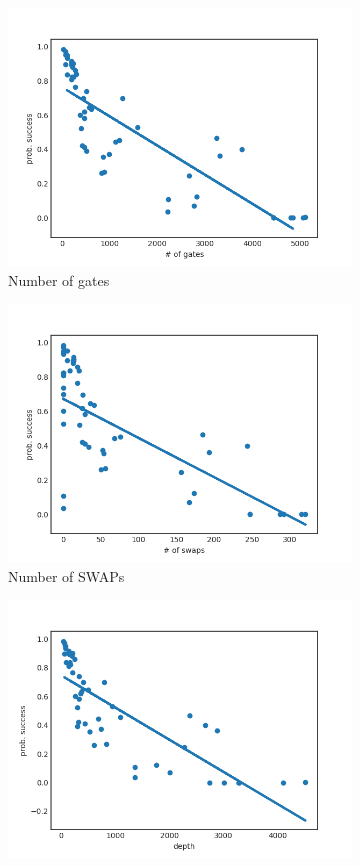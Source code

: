 \documentclass[11pt]{article}
\begin{document}
\begin{figure}[H] 
  \begin{subfigure}[b]{0.5\linewidth}
    \centering
    \includegraphics[width=0.75\linewidth]{ps_g_1000_0_005} 
    \caption{Number of gates} 
    \label{fig:ps_g_1000} 
    \vspace{4ex}
  \end{subfigure}%
  \begin{subfigure}[b]{0.5\linewidth}
    \centering
    \includegraphics[width=0.75\linewidth]{ps_s_1000_0_005} 
    \caption{Number of SWAPs} 
    \label{fig:ps_s_1000} 
    \vspace{4ex}
  \end{subfigure} 
  \begin{subfigure}[b]{0.5\linewidth}
    \centering
    \includegraphics[width=0.75\linewidth]{ps_d_1000_0_005} 

\end{subfigure}
\end{figure}
\end{document}
